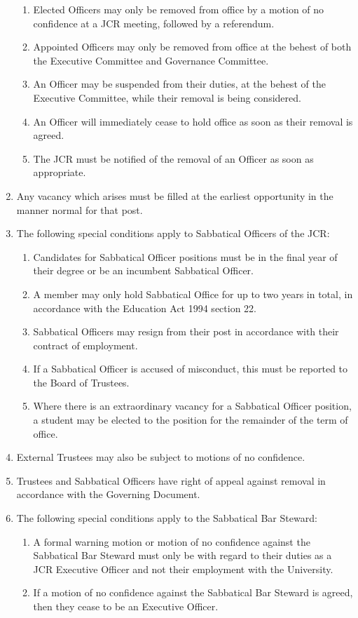 \documentclass[12pt]{article}
\begin{document}
\begin{enumerate}
\begin{enumerate}
        \item Elected Officers may only be removed from office by a motion of no confidence at a JCR meeting, followed by a referendum.
        \item Appointed Officers may only be removed from office at the behest of both the Executive Committee and Governance Committee.
        \item An Officer may be suspended from their duties, at the behest of the Executive Committee, while their removal is being considered.
        \item An Officer will immediately cease to hold office as soon as their removal is agreed.
        \item The JCR must be notified of the removal of an Officer as soon as appropriate.
    \end{enumerate}
    \item Any vacancy which arises must be filled at the earliest opportunity in the manner normal for that post.
    \item The following special conditions apply to Sabbatical Officers of the JCR:
    \begin{enumerate}
        \item Candidates for Sabbatical Officer positions must be in the final year of their degree or be an incumbent Sabbatical Officer.
        \item A member may only hold Sabbatical Office for up to two years in total, in accordance with the Education Act 1994 section 22.
        \item Sabbatical Officers may resign from their post in accordance with their contract of employment.
        \item If a Sabbatical Officer is accused of misconduct, this must be reported to the Board of Trustees.
        \item Where there is an extraordinary vacancy for a Sabbatical Officer position, a student may be elected to the position for the remainder of the term of office.
    \end{enumerate}
    \item External Trustees may also be subject to motions of no confidence.
    \item Trustees and Sabbatical Officers have right of appeal against removal in accordance with the Governing Document.
    \item The following special conditions apply to the Sabbatical Bar Steward:
    \begin{enumerate}
        \item A formal warning motion or motion of no confidence against the Sabbatical Bar Steward must only be with regard to their duties as a JCR Executive Officer and not their employment with the University.
        \item If a motion of no confidence against the Sabbatical Bar Steward is agreed, then they cease to be an Executive Officer.
    \end{enumerate}
\end{enumerate}
\newpage
\end{document}
